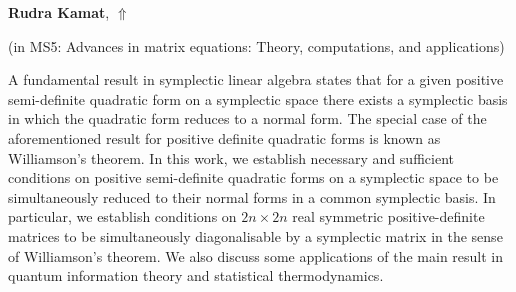 \documentclass[ILAS2025-program.tex]{subfiles}
\begin{document}
\hypertarget{down0364}{}\begin{ilasabstract}
    
\textbf{Rudra Kamat},  \hfill \hyperlink{up0364}{$\Uparrow$}
    
    
(in {\color{mstitle}MS5: Advances in matrix equations: Theory, computations, and applications})
        
\mtskip
    A fundamental result in symplectic linear algebra states that for a given positive semi-definite quadratic form on a symplectic space there exists a symplectic basis in which the quadratic form reduces to a normal form. The special case of the aforementioned result for positive definite quadratic forms is known as Williamson's theorem. In this work, we establish necessary and sufficient conditions on positive semi-definite quadratic forms on a symplectic space to be simultaneously reduced to their normal forms in a common symplectic basis. In particular, we establish conditions on \(2n\times 2n\) real symmetric positive-definite matrices to be simultaneously diagonalisable by a symplectic matrix in the sense of Williamson's theorem. We also discuss some applications of the main result in quantum information theory and statistical thermodynamics.

\end{ilasabstract}
    
\end{document}
